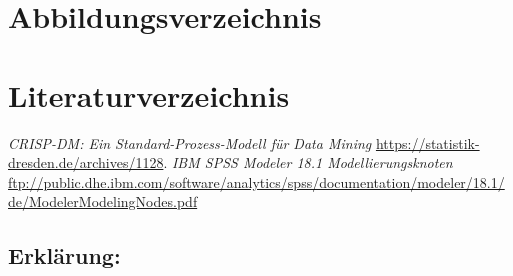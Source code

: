 \documentclass[a4paper,12pt]{article}
\begin{document}
\newpage
\section{Abbildungsverzeichnis}
\listoffigures
{}
\newpage

\newpage
\section{Literaturverzeichnis}
\thispagestyle{plain}
\begin{thebibliography}{DiplRS}
 {\it CRISP-DM: Ein Standard-Prozess-Modell für Data Mining} \url{ https://statistik-dresden.de/archives/1128}.
 {\it IBM SPSS Modeler 18.1 Modellierungsknoten} 
\url{ftp://public.dhe.ibm.com/software/analytics/spss/documentation/modeler/18.1/de/ModelerModelingNodes.pdf}
\end{thebibliography}

\newpage
\begin{titlepage}
\section*{Erklärung:}

\vfill
\end{titlepage}
\end{document}
